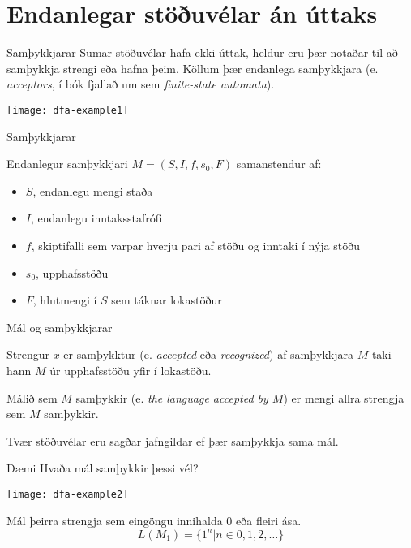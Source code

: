 \documentclass{beamer}
\begin{document}
\section{Endanlegar stöðuvélar án úttaks}

\begin{frame}{Samþykkjarar}
Sumar stöðuvélar hafa ekki úttak, heldur eru þær notaðar til að samþykkja strengi eða hafna þeim. Köllum þær endanlega samþykkjara (e. \emph{acceptors}, í bók fjallað um sem \emph{finite-state automata}). 

\begin{center}
\texttt{[image: dfa-example1]}
\end{center}


\end{frame}

\begin{frame}{Samþykkjarar}
\begin{tcolorbox}[title=Samþykkjarar]
Endanlegur samþykkjari $M = (S, I , f, s_0, F)$ samanstendur af:
\begin{itemize}
 \item $S$, endanlegu mengi staða
 \item $I$, endanlegu inntaksstafrófi
 \item $f$, skiptifalli sem varpar hverju pari af stöðu og inntaki í nýja stöðu
 \item $s_0$, upphafsstöðu
 \item $F$, hlutmengi í $S$ sem táknar lokastöður
\end{itemize}
\end{tcolorbox}
\end{frame}

\begin{frame}{Mál og samþykkjarar}
\begin{tcolorbox}
Strengur $x$ er samþykktur (e. \emph{accepted} eða \emph{recognized}) af samþykkjara $M$ taki hann $M$ úr upphafsstöðu yfir í lokastöðu.

Málið sem $M$ samþykkir (e. \emph{the language accepted by $M$}) er mengi allra strengja sem $M$ samþykkir.
\end{tcolorbox}
Tvær stöðuvélar eru sagðar jafngildar ef þær samþykkja sama mál.
\end{frame}

\begin{frame}{Dæmi}
Hvaða mál samþykkir þessi vél?

\begin{center}
\texttt{[image: dfa-example2]}
\end{center}

\pause
Mál þeirra strengja sem eingöngu innihalda 0 eða fleiri ása.
\[
 L(M_1) = \{1^n | n \in 0, 1, 2, \ldots \}
\]

\end{frame}
\end{document}

